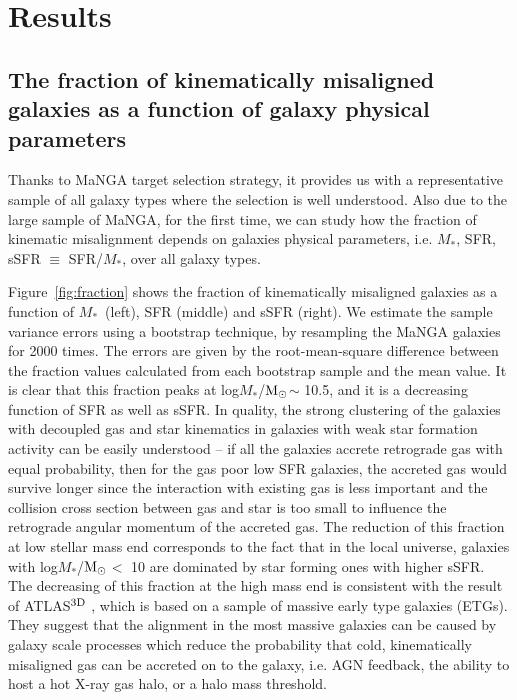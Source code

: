 \documentclass[a4paper,fleqn,usenatbib]{mnras}
\newcommand{\msun}{$\rm M_\odot$}
\newcommand{\mstar}{$M_*$}
\begin{document}

\section{Results}\label{sec:result}

\subsection {The fraction of kinematically misaligned galaxies as a function of galaxy physical parameters}\label{sec:fraction}


Thanks to MaNGA target selection strategy, it provides us with a representative sample of all galaxy types where the selection is 
well understood.
Also due to the large sample of MaNGA, for the first time, we can study
how the fraction of kinematic misalignment depends on galaxies physical parameters, i.e. \mstar, SFR, sSFR $\equiv$ SFR/\mstar, over all galaxy types.

Figure~\ref{fig:fraction} shows the fraction of kinematically misaligned galaxies as a function of \mstar\ (left), SFR (middle) and sSFR (right). 
We estimate the sample variance errors using a bootstrap technique, by resampling the MaNGA galaxies for 2000 times. 
The errors are given by the root-mean-square difference between the fraction values calculated from each bootstrap sample and the mean value.
It is clear that this fraction peaks at log\mstar/\msun $\sim$ 10.5, and it is a decreasing
function of SFR as well as sSFR. In quality, the strong clustering
of the galaxies with decoupled gas and star kinematics in galaxies
with weak star formation activity can be easily understood -- if
all the galaxies accrete retrograde gas with equal probability, then
for the gas poor low SFR galaxies, the accreted gas would survive longer
since the interaction with existing gas is less important and the collision
cross section between gas and star is too small to influence the retrograde
angular momentum of the accreted gas. The reduction of this fraction at
low stellar mass end corresponds to the fact that in the local universe,
galaxies with log\mstar/\msun $<$ 10 are dominated by star forming ones with higher sSFR. 
The decreasing of this fraction at the high mass end is consistent with
the result of ATLAS$^{\rm 3D}$ \citep{davis-2011}, which is based on a sample of massive
early type galaxies (ETGs). They suggest that the alignment in the most massive
galaxies can be caused by galaxy scale processes which reduce the probability
that cold, kinematically misaligned gas can be accreted on to the galaxy, i.e.
AGN feedback, the ability to host a hot X-ray gas halo, or a halo mass threshold.
\end{document}
